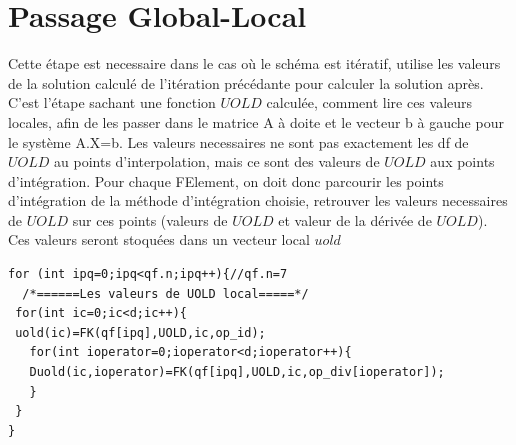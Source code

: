 \documentclass{book}
\begin{document}
\section{Passage Global-Local}
Cette étape est necessaire dans le cas où le schéma est itératif, utilise les valeurs de la solution calculé de l'itération précédante pour calculer la solution après. C'est l'étape sachant une fonction $UOLD$ calculée, comment lire ces valeurs locales, afin de les passer dans le matrice A à doite et le vecteur b à gauche pour le système A.X=b. Les valeurs necessaires ne sont pas exactement les df de $UOLD$ au points d'interpolation, mais ce sont des valeurs de $UOLD$ aux points d'intégration. Pour chaque FElement, on doit donc parcourir les points d'intégration de la méthode d'intégration choisie, retrouver les valeurs necessaires de $UOLD$ sur ces points (valeurs de $UOLD$ et valeur de la dérivée de $UOLD$). Ces valeurs seront stoquées dans un vecteur local $uold$
\begin{lstlisting}
for (int ipq=0;ipq<qf.n;ipq++){//qf.n=7
  /*======Les valeurs de UOLD local=====*/
 for(int ic=0;ic<d;ic++){ 
 uold(ic)=FK(qf[ipq],UOLD,ic,op_id);
   for(int ioperator=0;ioperator<d;ioperator++){
   Duold(ic,ioperator)=FK(qf[ipq],UOLD,ic,op_div[ioperator]);
   }	
 }	 
}
\end{lstlisting}


\end{document}
